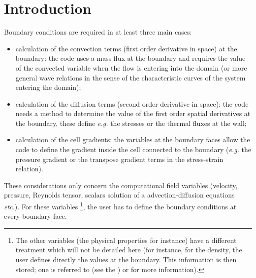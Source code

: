 
%
%
%
%

\section{Introduction}

Boundary conditions are required in at least three main cases:

\begin{itemize}
\item calculation of the convection terms (first order derivative in space) at
the boundary: the code uses a mass flux at the boundary and requires the
value of the convected variable when the flow is entering into
the domain (or more general wave relations in the sense of the characteristic curves of the system entering the domain);
\item calculation of the diffusion terms (second order derivative
in space): the code needs
a method to determine the value of the first order spatial derivatives
at the boundary, these define \emph{e.g.} the stresses or the thermal fluxes at the wall;
\item calculation of the cell  gradients: the variables at the boundary faces
 allow the code to define the gradient inside the cell connected to the boundary (\emph{e.g.} the pressure gradient or
the transpose gradient terms in the stress-strain relation).
\end{itemize}

These considerations only concern the computational field variables
(velocity, pressure, Reynolds tensor,
scalars solution of a advection-diffusion equations \emph{etc.}). For these variables
\footnote{
The other variables
(the physical properties for instance) have a different treatment which will
not be detailed here (for instance, for the density, the user defines
directly the values at the boundary. This information is then stored; one
is referred to  (see the )
 or  for more information).
},
the user has to define the boundary conditions at every boundary face.

